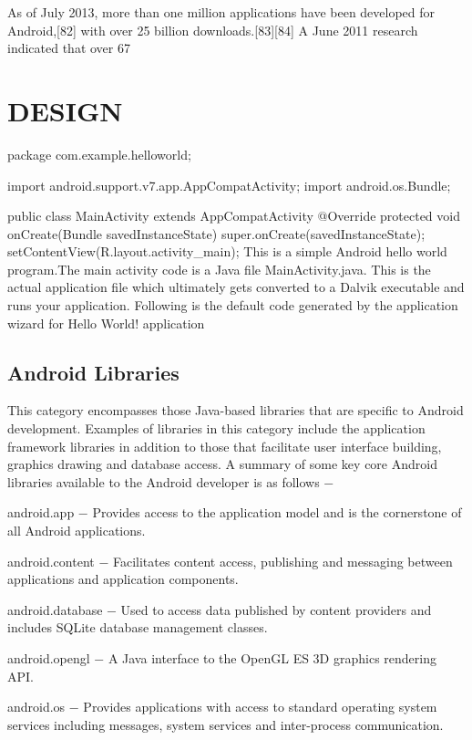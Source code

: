 \documentclass{fisatproject}
\begin{document}
As of July 2013, more than one million applications have been developed for Android,[82] with over 25 billion downloads.[83][84] A June 2011 research indicated that over 67%


\chapter{DESIGN}

package com.example.helloworld;

import android.support.v7.app.AppCompatActivity;
import android.os.Bundle;

public class MainActivity extends AppCompatActivity {
   @Override
   protected void onCreate(Bundle savedInstanceState) {
      super.onCreate(savedInstanceState);
      setContentView(R.layout.activity_main);
   }
}
This is a simple Android hello world program.The main activity code is a Java file MainActivity.java. This is the actual application file which ultimately gets converted to a Dalvik executable and runs your application. Following is the default code generated by the application wizard for Hello World! application

\section{Android Libraries}
This category encompasses those Java-based libraries that are specific to Android development. Examples of libraries in this category include the application framework libraries in addition to those that facilitate user interface building, graphics drawing and database access. A summary of some key core Android libraries available to the Android developer is as follows −

android.app − Provides access to the application model and is the cornerstone of all Android applications.

android.content − Facilitates content access, publishing and messaging between applications and application components.

android.database − Used to access data published by content providers and includes SQLite database management classes.

android.opengl − A Java interface to the OpenGL ES 3D graphics rendering API.

android.os − Provides applications with access to standard operating system services including messages, system services and inter-process communication.
\end{document}
